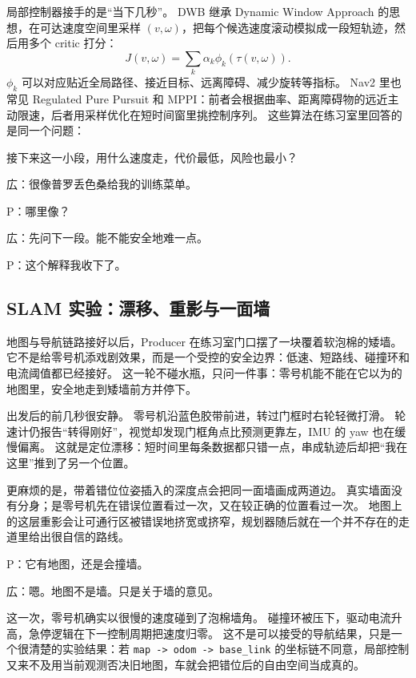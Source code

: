 局部控制器接手的是“当下几秒”。
DWB 继承 Dynamic Window Approach 的思想，在可达速度空间里采样 $(v,\omega)$，把每个候选速度滚动模拟成一段短轨迹，然后用多个 critic 打分\cite{fox1997dwa,nav2dwb}：
\begin{equation}
J(v,\omega)=
\sum_k \alpha_k \phi_k(\tau(v,\omega)).
\end{equation}
$\phi_k$ 可以对应贴近全局路径、接近目标、远离障碍、减少旋转等指标。
Nav2 里也常见 Regulated Pure Pursuit 和 MPPI：前者会根据曲率、距离障碍物的远近主动限速，后者用采样优化在短时间窗里挑控制序列\cite{nav2rpp,nav2mppi}。
这些算法在练习室里回答的是同一个问题：

\begin{center}
接下来这一小段，用什么速度走，代价最低，风险也最小？
\end{center}

広：很像普罗丢色桑给我的训练菜单。

P：哪里像？

広：先问下一段。能不能安全地难一点。

P：这个解释我收下了。

\subsection{SLAM 实验：漂移、重影与一面墙}

地图与导航链路接好以后，Producer 在练习室门口摆了一块覆着软泡棉的矮墙。
它不是给零号机添戏剧效果，而是一个受控的安全边界：低速、短路线、碰撞环和电流阈值都已经接好。
这一轮不碰水瓶，只问一件事：零号机能不能在它以为的地图里，安全地走到矮墙前方并停下。

出发后的前几秒很安静。
零号机沿蓝色胶带前进，转过门框时右轮轻微打滑。
轮速计仍报告“转得刚好”，视觉却发现门框角点比预测更靠左，IMU 的 yaw 也在缓慢偏离。
这就是定位漂移：短时间里每条数据都只错一点，串成轨迹后却把“我在这里”推到了另一个位置。

更麻烦的是，带着错位位姿插入的深度点会把同一面墙画成两道边。
真实墙面没有分身；是零号机先在错误位置看过一次，又在较正确的位置看过一次。
地图上的这层重影会让可通行区被错误地挤宽或挤窄，规划器随后就在一个并不存在的走道里给出很自信的路线。

P：它有地图，还是会撞墙。

広：嗯。地图不是墙。只是关于墙的意见。

这一次，零号机确实以很慢的速度碰到了泡棉墙角。
碰撞环被压下，驱动电流升高，急停逻辑在下一控制周期把速度归零。
这不是可以接受的导航结果，只是一个很清楚的实验结果：若 \texttt{map -> odom -> base\_link} 的坐标链不同意，局部控制又来不及用当前观测否决旧地图，车就会把错位后的自由空间当成真的。


